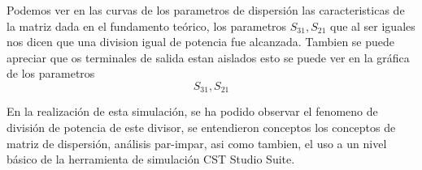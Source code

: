 \documentclass[a4paper]{IEEEtran} %
\begin{document}
Podemos ver en las curvas de los parametros de dispersión las caracteristicas de la matriz dada en el fundamento teórico, los parametros $S_{31},S_{21}$ que al ser iguales nos dicen que una division igual de potencia fue alcanzada.
Tambien se puede apreciar que os terminales de salida estan aislados esto se puede ver en la gráfica de los parametros $$S_{31},S_{21}$$ 

En la realización de esta simulación, se ha podido observar el fenomeno de división de potencia de este divisor, se entendieron conceptos los conceptos de matriz de dispersión, análisis par-impar, asi como tambien, el uso a un nivel básico de la herramienta de simulación CST Studio Suite.


\end{document}
